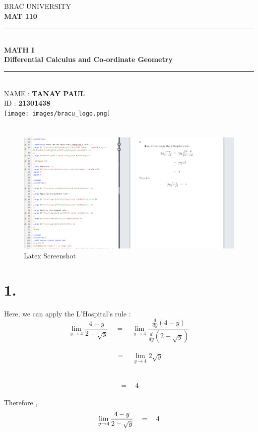 \documentclass[a4paper]{article}
\begin{document}
\begin{titlepage}

\newcommand{\HRule}{\rule{\linewidth}{0.5mm}} 							%
\center 
 
\textsc{\LARGE BRAC UNIVERSITY }\\[1cm]

\textsc{\Large \textbf{MAT 110}}\\[0.2cm] 										%
\HRule \\[0.4cm]
{ \huge \bfseries MATH I \\[0.4cm]Differential Calculus and Co-ordinate Geometry}\\[0.7cm]								%
\HRule \\[2cm]
\Large
{NAME : \textsc{\textbf{TANAY PAUL}}}\\
ID : \textbf{21301438}\\[1.5cm]
\texttt{[image: images/bracu\_logo.png]}\\[0.4cm] 	%
\vfill 
\newpage
\section*{}
\begin{figure}[h]
    \centering
    \includegraphics[scale=0.3]{ss.png}
    \caption{Latex Screenshot }
    \label{fig:my_label}
\end{figure}
\end{titlepage}


\section*{1.}

\LARGE\qquad Here, we can apply the L'Hospital's rule :\\
\Large $$ \lim_{y\to 4}\frac{4-y}{2-\sqrt{y}} \quad =  \quad\lim_{y\to 4}\frac{\frac{d}{dy}(4-y)}{\frac{d}{dy}(2-\sqrt{y})} $$
\\
\Large $$\qquad \quad = \quad \lim_{y\to 4}2\sqrt{y}$$
\\
\ $$=\quad 4$$
\\
\LARGE Therefore ,\\
\Large $$\lim_{y\to 4}\frac{4-y}{2-\sqrt{y}}\quad = \quad4 \\$$ 
\qquad \\
\qquad \\
\end{document}
